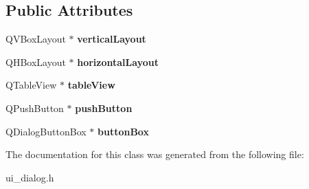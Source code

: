 \subsection*{Public Attributes}
\begin{DoxyCompactItemize}
\item 
\hypertarget{classUi__Dialog_a02f973813b741621c5461918b3d9d4bb}{Q\-V\-Box\-Layout $\ast$ {\bfseries vertical\-Layout}}\label{classUi__Dialog_a02f973813b741621c5461918b3d9d4bb}

\item 
\hypertarget{classUi__Dialog_ae66a1da203f045e33d71ed5abd46d2a1}{Q\-H\-Box\-Layout $\ast$ {\bfseries horizontal\-Layout}}\label{classUi__Dialog_ae66a1da203f045e33d71ed5abd46d2a1}

\item 
\hypertarget{classUi__Dialog_a5f31f3804071e6b2008a98e72be07cc3}{Q\-Table\-View $\ast$ {\bfseries table\-View}}\label{classUi__Dialog_a5f31f3804071e6b2008a98e72be07cc3}

\item 
\hypertarget{classUi__Dialog_aebeace7895da27076f8f90c301742ec3}{Q\-Push\-Button $\ast$ {\bfseries push\-Button}}\label{classUi__Dialog_aebeace7895da27076f8f90c301742ec3}

\item 
\hypertarget{classUi__Dialog_a271a59402f80983c2722bb455db37365}{Q\-Dialog\-Button\-Box $\ast$ {\bfseries button\-Box}}\label{classUi__Dialog_a271a59402f80983c2722bb455db37365}

\end{DoxyCompactItemize}


The documentation for this class was generated from the following file\-:\begin{DoxyCompactItemize}
\item 
ui\-\_\-dialog.\-h\end{DoxyCompactItemize}
